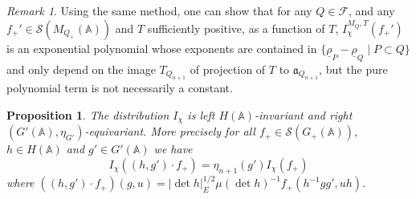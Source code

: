 \documentclass[letterpaper,11pt]{amsart}
\newcommand{\fa}{\mathfrak{a}}
\newcommand{\bA}{\mathbb{A}}
\newcommand{\cF}{\mathcal{F}}
\newcommand{\cS}{\mathcal{S}}
\newcommand{\<}{\negthickspace}
\providecommand{\abs}[1]{\lvert#1\rvert}
\theoremstyle{definition}
\theoremstyle{plain}
\newtheorem{prop}[definition]{Proposition}
\theoremstyle{remark}
\newtheorem{remark}[definition]{Remark}
\numberwithin{equation}{section}
\begin{document}
\begin{remark} \label{rmk:distribution_on_Levi}
Using the same method, one can show that for any $Q \in \cF$, and
any $f_+' \in \cS(M_{Q_+}(\bA))$ and $T$ sufficiently positive, as a function
of $T$, $I^{M_Q,T}_\chi(f_+')$ is an exponential polynomial whose exponents
are contained in $\{ \underline{\rho}_P - \underline{\rho}_Q \mid P \subset Q
\}$ and only depend on the image $T_{Q_{n+1}}$ of projection of $T$ to
$\fa_{Q_{n+1}}$, but the pure polynomial term is not necessarily a constant.
\end{remark}

\begin{prop}    \label{prop:invariant_I_chi}
The distribution $I_\chi$ is left $H(\bA)$-invariant and right
$(G'(\bA),\eta_{G'})$-equivariant. More precisely for all $f_+ \in
\cS(G_+(\bA))$, $h \in H(\bA)$ and $g' \in G'(\bA)$ we have
    \[
    I_\chi((h, g') \cdot f_+)= \eta_{n+1}(g') I_\chi(f_+)
    \]
where $((h, g') \cdot f_+)(g,u)=\abs{\det h}_E^{1/2} \mu(\det h)^{-1}
f_+(h^{-1} g g',uh)$.
\end{prop}
\end{document}
